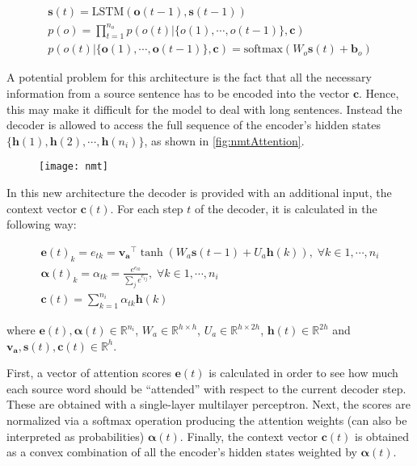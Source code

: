 \begin{equation} \label{eq:decoder}
	\begin{gathered}
		\mathbf{s}(t) = \text{LSTM}(\mathbf{o}(t-1), \mathbf{s}(t-1)) \\
		p(o) = \prod_{t=1}^{n_o} p(o(t)|\{o(1), \cdots, o(t-1)\}, \mathbf{c}) \\
		p(o(t)|\{\mathbf{o}(1), \cdots, \mathbf{o}(t-1)\}, \mathbf{c}) = \text{softmax}(W_o \mathbf{s}(t) +\textbf{b}_o)
	\end{gathered}
\end{equation}

A potential problem for this architecture is the fact that all the necessary information from a source sentence has to be encoded into the vector $\mathbf{c}$. Hence, this may make it difficult for the model to deal with long sentences. Instead the decoder is allowed to access the full sequence of the encoder's hidden states $\{\mathbf{h}(1), \mathbf{h}(2), \cdots, \mathbf{h}(n_i)\}$, as shown in \autoref{fig:nmtAttention}.

\begin{figure}[H]
	\centering
	\texttt{[image: nmt]}
	\label{fig:nmtAttention}
\end{figure}

In this new architecture the decoder is provided with an additional input, the context vector $\mathbf{c}(t)$. For each step $t$ of the decoder, it is calculated in the following way:

\begin{equation} \label{eq:nmtAttention}
	\begin{gathered}
		\mathbf{e}(t)_k = e_{tk} = \mathbf{v_a}^{\top} \tanh(W_a \mathbf{s}(t-1)+U_a\mathbf{h}(k)), \; \forall k \in 1, \cdots , n_i  \\
		\boldsymbol{\alpha}(t)_k = \alpha_{tk} = \frac{e^{e_{tk}}}{\sum_{j}e^{e_{tj}}}, \; \forall k \in 1, \cdots , n_i  \\
		\mathbf{c}(t) = \sum_{k=1}^{n_i} \alpha_{tk} \mathbf{h}(k)
	\end{gathered}
\end{equation}

where $\mathbf{e}(t),\boldsymbol{\alpha}(t) \in \mathbb{R}^{n_i}$, $W_a \in \mathbb{R}^{h \times h}$, $U_a \in \mathbb{R}^{h \times 2h}$, $\mathbf{h}(t) \in \mathbb{R}^{2h}$ and $\mathbf{v_a},\mathbf{s}(t),\mathbf{c}(t) \in \mathbb{R}^{h}$. 

First, a vector of attention scores $\mathbf{e}(t)$ is calculated in order to see how much each source word should be ``attended'' with respect to the current decoder step. These are obtained with a single-layer multilayer perceptron. Next, the scores are normalized via a softmax operation producing the attention weights (can also be interpreted as probabilities)  $\boldsymbol{\alpha}(t)$. Finally, the context vector $\mathbf{c}(t)$ is obtained as a convex combination of all the encoder's hidden states weighted by $\boldsymbol{\alpha}(t)$.

